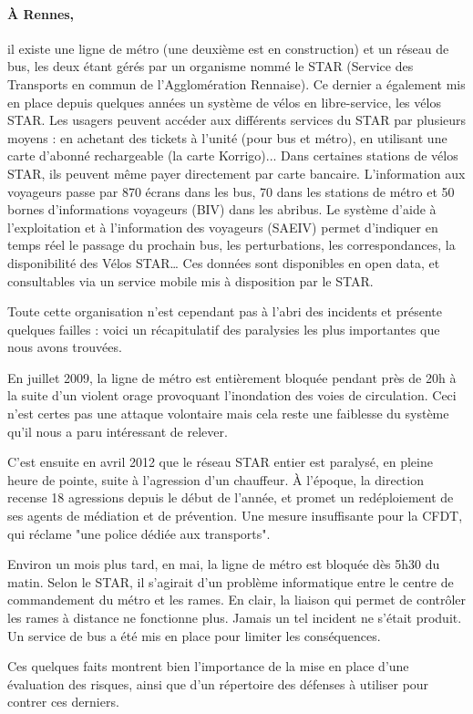 	\paragraph{À Rennes,} il existe une ligne de métro (une deuxième est en construction) et un réseau de bus, les deux étant gérés par un organisme nommé le STAR (Service des Transports en commun de l'Agglomération Rennaise). Ce dernier a également mis en place depuis quelques années un système de vélos en libre-service, les vélos STAR. Les usagers peuvent accéder aux différents services du STAR par plusieurs moyens : en achetant des tickets à l'unité (pour bus et métro), en utilisant une carte d'abonné rechargeable (la carte Korrigo)... Dans certaines stations de vélos STAR, ils peuvent même payer directement par carte bancaire. L'information aux voyageurs passe par 870 écrans dans les bus, 70 dans les stations de métro et 50 bornes d’informations voyageurs (BIV) dans les abribus. Le système d’aide à l’exploitation et à l’information des voyageurs (SAEIV) permet d’indiquer en temps réel le passage du prochain bus, les perturbations, les correspondances, la disponibilité des Vélos STAR… Ces données sont disponibles en open data, et consultables via un service mobile mis à disposition par le STAR.

	Toute cette organisation n'est cependant pas à l'abri des incidents et présente quelques failles : voici un récapitulatif des paralysies les plus importantes que nous avons trouvées.

	En juillet 2009, la ligne de métro est entièrement bloquée pendant près de 20h à la suite d'un violent orage provoquant l'inondation des voies de circulation. Ceci n'est certes pas une attaque volontaire mais cela reste une faiblesse du système qu'il nous a paru intéressant de relever. 

	C'est ensuite en avril 2012 que le réseau STAR entier est paralysé, en pleine heure de pointe, suite à l'agression d'un chauffeur. À l'époque, la direction recense 18 agressions depuis le début de l'année, et promet un redéploiement de ses agents de médiation et de prévention. Une mesure insuffisante pour la CFDT, qui réclame "une police dédiée aux transports".

	Environ un mois plus tard, en mai, la ligne de métro est bloquée dès 5h30 du matin. Selon le STAR, il s’agirait d’un problème informatique entre le centre de commandement du métro et les rames. En clair, la liaison qui permet de contrôler les rames à distance ne fonctionne plus. Jamais un tel incident ne s’était produit. Un service de bus a été mis en place pour limiter les conséquences.

	Ces quelques faits montrent bien l'importance de la mise en place d'une évaluation des risques, ainsi que d'un répertoire des défenses à utiliser pour contrer ces derniers.
